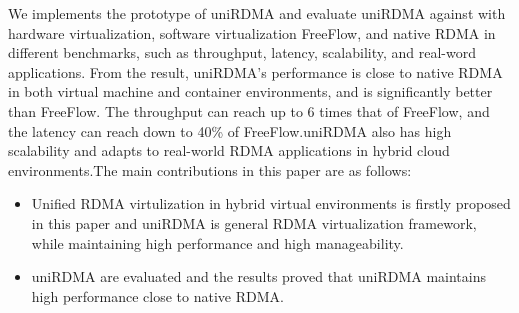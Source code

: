 We implements the prototype of uniRDMA and evaluate uniRDMA against with hardware virtualization, software virtualization FreeFlow, and native RDMA in different benchmarks, such as throughput, latency, scalability, and real-word applications. From the result, uniRDMA's performance is close to native RDMA in both virtual machine and container environments, and is significantly better than FreeFlow. The throughput can reach up to 6 times that of FreeFlow, and the latency can reach down to 40\% of FreeFlow.uniRDMA also has high scalability and adapts to real-world RDMA applications in hybrid cloud environments.The main contributions in this paper are as follows:

\begin{itemize}
\item Unified RDMA virtulization in hybrid virtual environments is firstly proposed in this paper and uniRDMA is general RDMA virtualization framework,  while maintaining high performance and high manageability.

\item uniRDMA are evaluated and the results proved that uniRDMA maintains high performance close to native RDMA.
\end{itemize}
